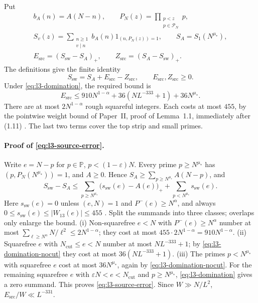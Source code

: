 Put
\begin{equation}\label{eq:l3-sieved-source}
\begin{gathered}
 b_A(n)=A(N-n),\qquad
 P_N(z)=\prod_{\substack{p<z\\p\in\mathcal P_N}}p,\\
 S_v(z)=\sum_{\substack{n\ge1\\v\mid n}}b_A(n)1_{(n,P_N(z))=1},
 \qquad S_A=S_1(N^{\mu_*}),\\
 E_{\mathrm{src}}=(S_{\mathrm{sw}}-S_A)_+,\qquad
 Z_{\mathrm{src}}=(S_A-S_{\mathrm{sw}})_+.
\end{gathered}
\end{equation}
The definitions give the finite identity
\begin{equation}\label{eq:l3-source-id}
 S_{\mathrm{sw}}=S_A+E_{\mathrm{src}}-Z_{\mathrm{src}},
 \qquad E_{\mathrm{src}},Z_{\mathrm{src}}\ge0.
\end{equation}
Under \eqref{eq:l3-domination}, the required bound is
\begin{equation}\label{eq:l3-source-error}
 E_{\mathrm{src}}\le910N^{1-\alpha}
            +36(NL^{-333}+1)+36N^{\mu_*}.
\end{equation}
There are at most $2N^{1-\alpha}$ rough squareful integers.
Each costs at most $455$, by the pointwise weight bound of
Paper~II, proof of Lemma~1.1, immediately after (1.11)
\cite[Lemma~1.1, proof after (1.11)]{PaperII}.
The last two terms cover the top strip and small primes.
\paragraph{Proof of \eqref{eq:l3-source-error}.}
Write $e=N-p$ for $p\in\mathbb P$, $p<(1-\varepsilon)N$.
Every prime $p\ge N^{\mu_*}$ has $(p,P_N(N^{\mu_*}))=1$, and $A\ge0$.
Hence $S_A\ge\sum_{p\ge N^{\mu_*}}A(N-p)$, and
\[
 S_{\mathrm{sw}}-S_A\le\sum_{p\ge N^{\mu_*}}\bigl(s_{\mathrm{sw}}(e)-A(e)\bigr)_+
                +\sum_{p<N^{\mu_*}}s_{\mathrm{sw}}(e).
\]
Here $s_{\mathrm{sw}}(e)=0$ unless $(e,N)=1$ and $P^-(e)\ge N^\alpha$,
and always $0\le s_{\mathrm{sw}}(e)\le|W_{13}(e)|\le455$
\cite[Lemma~1.1, proof after (1.11)]{PaperII}.
Split the summands into three classes; overlaps only enlarge the bound.
(i) Non-squarefree $e<N$ with $P^-(e)\ge N^\alpha$ number at most
$\sum_{\ell\ge N^\alpha}N/\ell^2\le2N^{1-\alpha}$; they cost at most
$455\cdot2N^{1-\alpha}=910N^{1-\alpha}$.
(ii) Squarefree $e$ with $N_{\mathrm{cut}}\le e<N$ number at most
$NL^{-333}+1$; by \eqref{eq:l3-domination-nocut} they cost at most
$36(NL^{-333}+1)$.
(iii) The primes $p<N^{\mu_*}$ with squarefree $e$ cost at most $36N^{\mu_*}$,
again by \eqref{eq:l3-domination-nocut}.
For the remaining squarefree $e$ with $\varepsilon N<e<N_{\mathrm{cut}}$
and $p\ge N^{\mu_*}$, \eqref{eq:l3-domination} gives a zero summand.
This proves \eqref{eq:l3-source-error}. Since $W\gg N/L^2$,
$E_{\mathrm{src}}/W\ll L^{-331}$.


